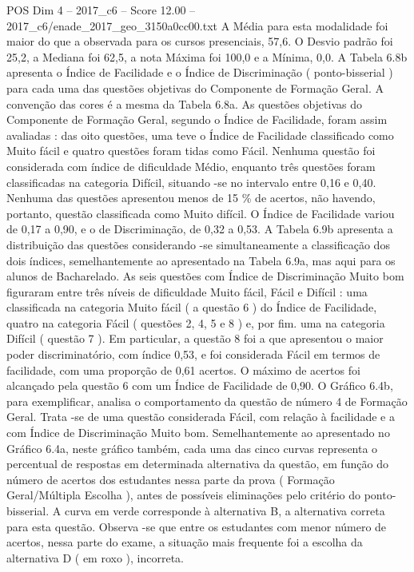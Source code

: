 \begin{textsample}{POS Dim 4 – 2017\_c6 – Score 12.00 – 2017\_c6/enade\_2017\_geo\_3150a0cc00.txt}
A Média para esta modalidade foi maior do que a observada para os cursos presenciais, 57,6.
O Desvio padrão foi 25,2, a Mediana foi 62,5, a nota Máxima foi 100,0 e a Mínima, 0,0.
A Tabela 6.8b apresenta o Índice de Facilidade e o Índice de Discriminação ( ponto-bisserial ) para cada uma das questões objetivas do Componente de Formação Geral.
A convenção das cores é a mesma da Tabela 6.8a.
As questões objetivas do Componente de Formação Geral, segundo o Índice de Facilidade, foram assim avaliadas : das oito questões, uma teve o Índice de Facilidade classificado como Muito fácil e quatro questões foram tidas como Fácil.
Nenhuma questão foi considerada com índice de dificuldade Médio, enquanto três questões foram classificadas na categoria Difícil, situando -se no intervalo entre 0,16 e 0,40.
Nenhuma das questões apresentou menos de 15 \% de acertos, não havendo, portanto, questão classificada como Muito difícil.
O Índice de Facilidade variou de 0,17 a 0,90, e o de Discriminação, de 0,32 a 0,53.
A Tabela 6.9b apresenta a distribuição das questões considerando -se simultaneamente a classificação dos dois índices, semelhantemente ao apresentado na Tabela 6.9a, mas aqui para os alunos de Bacharelado.
As seis questões com Índice de Discriminação Muito bom figuraram entre três níveis de dificuldade Muito fácil, Fácil e Difícil : uma classificada na categoria Muito fácil ( a questão 6 ) do Índice de Facilidade, quatro na categoria Fácil ( questões 2, 4, 5 e 8 ) e, por fim. uma na categoria Difícil ( questão 7 ).
Em particular, a questão 8 foi a que apresentou o maior poder discriminatório, com índice 0,53, e foi considerada Fácil em termos de facilidade, com uma proporção de 0,61 acertos.
O máximo de acertos foi alcançado pela questão 6 com um Índice de Facilidade de 0,90.
O Gráfico 6.4b, para exemplificar, analisa o comportamento da questão de número 4 de Formação Geral.
Trata -se de uma questão considerada Fácil, com relação à facilidade e a com Índice de Discriminação Muito bom.
Semelhantemente ao apresentado no Gráfico 6.4a, neste gráfico também, cada uma das cinco curvas representa o percentual de respostas em determinada alternativa da questão, em função do número de acertos dos estudantes nessa parte da prova ( Formação Geral/Múltipla Escolha ), antes de possíveis eliminações pelo critério do ponto-bisserial.
A curva em verde corresponde à alternativa B, a alternativa correta para esta questão.
Observa -se que entre os estudantes com menor número de acertos, nessa parte do exame, a situação mais frequente foi a escolha da alternativa D ( em roxo ), incorreta.

\end{textsample}
